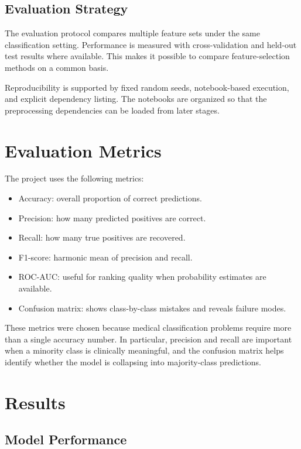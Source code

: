 \documentclass[11pt,a4paper]{article}
\begin{document}
\subsection{Evaluation Strategy}


The evaluation protocol compares multiple feature sets under the same classification setting. Performance is measured with cross-validation and held-out test results where available. This makes it possible to compare feature-selection methods on a common basis.

Reproducibility is supported by fixed random seeds, notebook-based execution, and explicit dependency listing. The notebooks are organized so that the preprocessing dependencies can be loaded from later stages.

\section{Evaluation Metrics}


The project uses the following metrics:
\begin{itemize}[leftmargin=*]
    \item Accuracy: overall proportion of correct predictions.
    \item Precision: how many predicted positives are correct.
    \item Recall: how many true positives are recovered.
    \item F1-score: harmonic mean of precision and recall.
    \item ROC-AUC: useful for ranking quality when probability estimates are available.
    \item Confusion matrix: shows class-by-class mistakes and reveals failure modes.
\end{itemize}

These metrics were chosen because medical classification problems require more than a single accuracy number. In particular, precision and recall are important when a minority class is clinically meaningful, and the confusion matrix helps identify whether the model is collapsing into majority-class predictions.

\section{Results}
\subsection{Model Performance}
\end{document}
